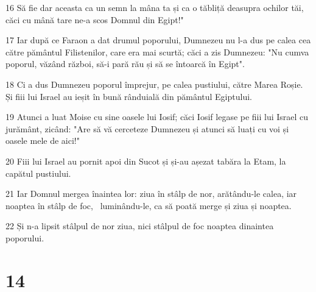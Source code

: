 \par 16 Să fie dar aceasta ca un semn la mâna ta și ca o tăbliță deasupra ochilor tăi, căci cu mână tare ne-a scos Domnul din Egipt!"
\par 17 Iar după ce Faraon a dat drumul poporului, Dumnezeu nu l-a dus pe calea cea către pământul Filistenilor, care era mai scurtă; căci a zis Dumnezeu: "Nu cumva poporul, văzând război, să-i pară rău și să se întoarcă în Egipt".
\par 18 Ci a dus Dumnezeu poporul împrejur, pe calea pustiului, către Marea Roșie. Și fiii lui Israel au ieșit în bună rânduială din pământul Egiptului.
\par 19 Atunci a luat Moise cu sine oasele lui Iosif; căci Iosif legase pe fiii lui Israel cu jurământ, zicând: "Are să vă cerceteze Dumnezeu și atunci să luați cu voi și oasele mele de aici!"
\par 20 Fiii lui Israel au pornit apoi din Sucot și și-au așezat tabăra la Etam, la capătul pustiului.
\par 21 Iar Domnul mergea înaintea lor: ziua în stâlp de nor, arătându-le calea, iar noaptea în stâlp de foc,  luminându-le, ca să poată merge și ziua și noaptea.
\par 22 Și n-a lipsit stâlpul de nor ziua, nici stâlpul de foc noaptea dinaintea poporului.

\chapter{14}

